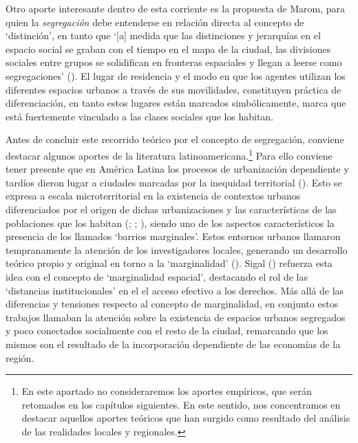 \documentclass[
  spanish,
  a4paper,%
  chapterprefix=true,%
  DIV=calc,%
  twoside]{scrbook}%
\begin{document}
Otro aporte interesante dentro de esta corriente es la propuesta de
Marom, para quien la \emph{segregación} debe entenderse en relación directa
al concepto de `distinción', en tanto que `{[}a{]} medida que las
distinciones y jerarquías en el espacio social se graban con el tiempo
en el mapa de la ciudad, las divisiones sociales entre grupos se
solidifican en fronteras espaciales y llegan a leerse como
segregaciones' (). El lugar de residencia y el modo
en que los agentes utilizan los diferentes espacios urbanos a través de
sus movilidades, constituyen práctica de diferenciación, en tanto estos
lugares están marcados simbólicamente, marca que está fuertemente
vinculado a las clases sociales que los habitan.

Antes de concluir este recorrido teórico por el concepto de segregación,
conviene destacar algunos aportes de la literatura
latinoamericana.\footnote{En este apartado no consideraremos los aportes
  empíricos, que serán retomados en los capítulos siguientes. En este
  sentido, nos concentramos en destacar aquellos aportes teóricos que
  han surgido como resultado del análisis de las realidades locales y
  regionales.} Para ello conviene tener presente
que en América Latina los procesos de urbanización dependiente y tardíos
dieron lugar a ciudades marcadas por la inequidad territorial
(). Esto se expresa a escala microterritorial en la
existencia de contextos urbanos diferenciados por el origen de dichas
urbanizaciones y las características de las poblaciones que los habitan
(; ; ),
siendo uno de los
aspectos característicos la presencia de los llamados `barrios
marginales'. Estos entornos urbanos llamaron tempranamente la atención
de los investigadores locales, generando un desarrollo teórico propio y
original en torno a la `marginalidad' ().
Sigal ()
refuerza esta idea con el concepto de `marginalidad espacial',
destacando el rol de las `distancias institucionales' en el el acceso
efectivo a los derechos. Más allá de las diferencias y tensiones
respecto al concepto de marginalidad, en conjunto estos trabajos
llamaban la atención sobre la existencia de espacios urbanos segregados
y poco conectados socialmente con el resto de la ciudad, remarcando que
los mismos son el resultado de la incorporación dependiente de las
economías de la región.
\end{document}
